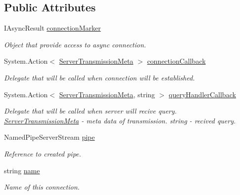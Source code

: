\subsection*{Public Attributes}
\begin{DoxyCompactItemize}
\item 
I\+Async\+Result \mbox{\hyperlink{class_pipes_provider_1_1_server_transmission_meta_a1d4a87ad9a66bd81bc68f48fa28dbf32}{connection\+Marker}}
\begin{DoxyCompactList}\small\item\em Object that provide access to async connection. \end{DoxyCompactList}\item 
System.\+Action$<$ \mbox{\hyperlink{class_pipes_provider_1_1_server_transmission_meta}{Server\+Transmission\+Meta}} $>$ \mbox{\hyperlink{class_pipes_provider_1_1_server_transmission_meta_a6e9fa5426107e5d4265273e5be439a62}{connection\+Callback}}
\begin{DoxyCompactList}\small\item\em Delegate that will be called when connection will be established. \end{DoxyCompactList}\item 
System.\+Action$<$ \mbox{\hyperlink{class_pipes_provider_1_1_server_transmission_meta}{Server\+Transmission\+Meta}}, string $>$ \mbox{\hyperlink{class_pipes_provider_1_1_server_transmission_meta_aa663870a4d61945bcedd85721ede42a5}{query\+Handler\+Callback}}
\begin{DoxyCompactList}\small\item\em Delegate that will be called when server will recive query. \mbox{\hyperlink{class_pipes_provider_1_1_server_transmission_meta}{Server\+Transmission\+Meta}} -\/ meta data of transmission. string -\/ recived query. \end{DoxyCompactList}\item 
Named\+Pipe\+Server\+Stream \mbox{\hyperlink{class_pipes_provider_1_1_server_transmission_meta_a8b2ff8796056a5a2fbe0dbb4c4fd5dab}{pipe}}
\begin{DoxyCompactList}\small\item\em Reference to created pipe. \end{DoxyCompactList}\item 
string \mbox{\hyperlink{class_pipes_provider_1_1_server_transmission_meta_abed6acbaaf01392151667fad217ec7c3}{name}}
\begin{DoxyCompactList}\small\item\em Name of this connection. \end{DoxyCompactList}\end{DoxyCompactItemize}
